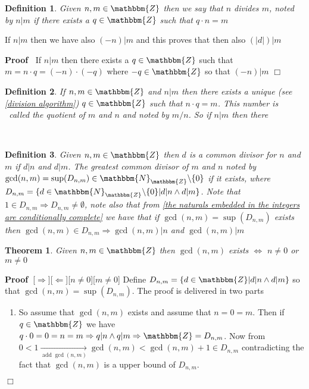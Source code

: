 \documentclass{book}
\newcommand{\Rightarrowlim}{\mathop{\rightarrow}\limits}
\newcommand{\tmop}[1]{\ensuremath{\operatorname{#1}}}
\newcommand{\um}{-}
\newcommand{\upl}{+}
\newenvironment{proof}{\noindent\textbf{Proof\ }}{\hspace*{\fill}$\Box$\medskip}
\newtheorem{definition}{Definition}
{\theorembodyfont{\rmfamily}\newtheorem{example}{Example}}
\newtheorem{theorem}{Theorem}
\begin{document}
{{\begin{definition}
  \label{divides}{}Given $n, m \in \mathbbm{Z}$ then we say
  that $n$ divides $m$, noted by $n|m$ if there exists a $q \in \mathbbm{Z}$
  such that $q \cdot n = m$
\end{definition}

\begin{note}
  If $n|m$ then we have also $(\um n) |m$ and this proves that then also $(| d
  |) |m$
\end{note}

\begin{proof}
  If $n|m$ then there exists a $q \in \mathbbm{Z}$ such that $m = n \cdot q =
  (\um n) \cdot (- q)$ where $- q \in \mathbbm{Z}$ so that $(\um n) |m$
\end{proof}

\begin{definition}
  If $n, m \in \mathbbm{Z}$ and $n|m$ then there exists a unique (see
  \ref{division algorithm}) $q \in \mathbbm{Z}$ such that $n \cdot q = m$.
  This number is \ called the quotient of $m$ and $n$ and noted by $m / n$. So
  if $n|m$ then there 
\end{definition}

\

\begin{definition}
  \label{common divisior and gcd}{}{}Given
  $n, m \in \mathbbm{Z}$ then $d$ is a common divisor for $n$ and $m$ if $d|n$
  and $d|m$. The greatest common divisor of $m$ and $n$ noted by $\gcd (n, m)
  = \sup (D_{n, m}) \in \mathbbm{N}_{\mathbbm{Z}} \backslash \{ 0 \}$ if it
  exists, where $D_{n, m} = \{ d \in \mathbbm{N}_{\mathbbm{Z}} \backslash \{ 0
  \} | d|n \wedge d|m \}$. Note that $1 \in D_{n, m} \Rightarrow D_{n, m} \neq
  \emptyset$, note also that from \ref{the naturals embedded in the integers
  are conditionally complete} we have that if $\gcd (n, m) = \sup (D_{n, m})$
  exists then $\gcd (n, m) \in D_{n, m} \Rightarrow \gcd (n, m) |n$ and $\gcd
  (n, m) |m$ 
\end{definition}

\begin{theorem}
  Given $n, m \in \mathbbm{Z}$ then $\gcd (n, m)$ exists $\Leftrightarrow$ $n
  \neq 0$ or $m \neq 0$
\end{theorem}

\begin{proof}[$\Rightarrow$][$\Leftarrow$][$n \neq 0$][$m \neq 0$]
  Define $D_{n, m} = \{ d \in \mathbbm{Z}|d|n \wedge d|m \}$ so that $\gcd (n,
  m) = \sup (D_{n, m})$. The proof is delivered in two parts
  \begin{enumerate}
    \item So assume that $\gcd (n, m)$ exists and assume that $n = 0 = m$.
    Then if $q \in \mathbbm{Z}$ we have $q \cdot 0 = 0 = n = m \Rightarrow q|n
    \wedge q|m \Rightarrow \mathbbm{Z}= D_{n, m}$. Now from $0 < 1
    \Rightarrowlim_{\tmop{add} \gcd (n, m)} \gcd (n, m) < \gcd (n, m) \upl 1
    \in D_{n, m}$ contradicting the fact that $\gcd (n, m)$ is a upper bound
    of $D_{n, m}$.
    

\end{enumerate}
\end{proof}}}
\end{document}
